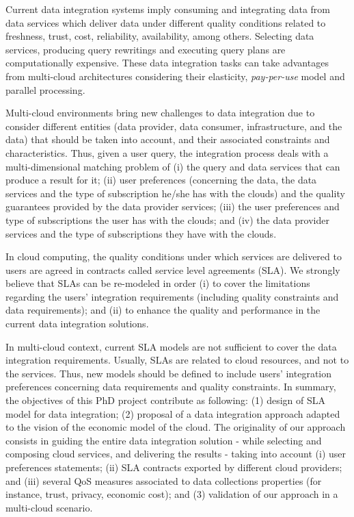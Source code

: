Current data integration systems imply consuming and integrating data from data services which deliver data under different quality conditions related to freshness, trust, cost, reliability, availability, among others. Selecting data services, producing query rewritings and executing query plans are computationally expensive. These data integration tasks can take advantages from multi-cloud architectures considering their elasticity, \textit{pay-per-use} model and parallel processing.

Multi-cloud environments bring new challenges to data integration due to consider different entities (data provider, data consumer, infrastructure, and the data) that should be taken into account, and their associated constraints and characteristics. Thus, given a user query, the integration process deals with a multi-dimensional matching problem of (i) the query and data services that can produce a result for it; (ii) user preferences (concerning the data, the data services and the type of subscription he/she has with the clouds) and the quality guarantees provided by the data provider services; (iii) the user preferences and type of subscriptions the user has with the clouds; and (iv) the data provider services and the type of subscriptions they have with the clouds.

In cloud computing, the quality conditions under which services are delivered to users are agreed in contracts called service level agreements (SLA). We strongly believe that SLAs can be re-modeled in order (i) to cover the limitations regarding the users' integration requirements (including quality constraints and data requirements); and (ii) to enhance the quality and performance in the current data integration solutions. 

In multi-cloud context, current SLA models are not sufficient to cover the data integration requirements. Usually, SLAs are related to cloud resources, and not to the services. Thus, new models should be defined to include users' integration preferences concerning data requirements and quality constraints. In summary, the objectives of this PhD project contribute as following: (1) design of SLA model for data integration; (2) proposal of a data integration approach adapted to the vision of the economic model of the cloud. The originality of our approach consists in guiding the entire data integration solution - while selecting and composing cloud services, and delivering the results - taking into account (i) user preferences statements; (ii) SLA contracts exported by different cloud providers; and (iii) several QoS measures associated to data collections properties (for instance, trust, privacy, economic cost); and (3) validation of our approach in a multi-cloud scenario.

